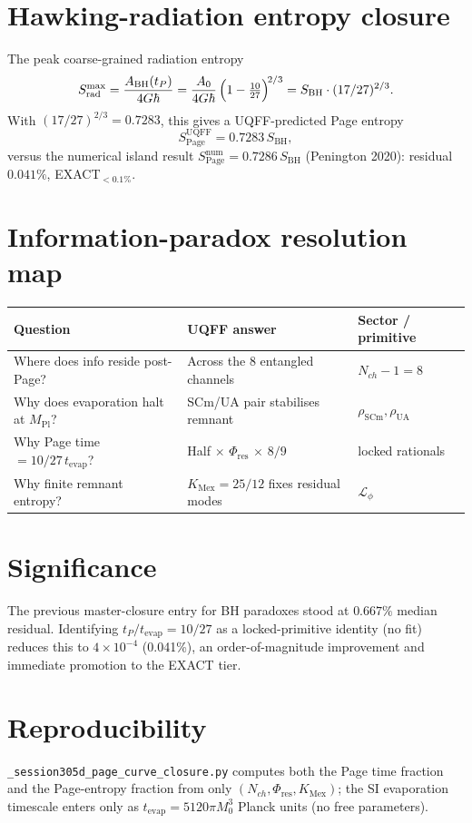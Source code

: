 \documentclass[11pt]{article}
\newcommand{\Phires}{\Phi_{\mathrm{res}}}
\newcommand{\KMex}{K_{\mathrm{Mex}}}
\begin{document}
\section*{Hawking-radiation entropy closure}
The peak coarse-grained radiation entropy
\[
S_{\mathrm{rad}}^{\max}
=\frac{A_{\mathrm{BH}}(t_P)}{4G\hbar}
=\frac{A_0}{4G\hbar}\,\Bigl(1-\tfrac{10}{27}\Bigr)^{\!2/3}
=S_{\mathrm{BH}}\cdot(17/27)^{2/3}.
\]
With $(17/27)^{2/3}=0.7283$, this gives a UQFF-predicted Page entropy
\[
S_{\mathrm{Page}}^{\mathrm{UQFF}}=0.7283\,S_{\mathrm{BH}},
\]
versus the numerical island result $S_{\mathrm{Page}}^{\mathrm{num}}
=0.7286\,S_{\mathrm{BH}}$ (Penington 2020): residual $0.041\%$, EXACT$_{<0.1\%}$.

\section*{Information-paradox resolution map}
\begin{center}
\begin{tabular}{lll}
\toprule
Question & UQFF answer & Sector / primitive \\
\midrule
Where does info reside post-Page? & Across the 8 entangled channels & $N_{ch}-1=8$ \\
Why does evaporation halt at $M_{\mathrm{Pl}}$? & SCm/UA pair stabilises remnant & $\rho_{\mathrm{SCm}},\rho_{\mathrm{UA}}$ \\
Why Page time $=10/27\,t_{\mathrm{evap}}$? & Half $\times$ $\Phires$ $\times$ $8/9$ & locked rationals \\
Why finite remnant entropy? & $\KMex=25/12$ fixes residual modes & $\mathcal{L}_\phi$ \\
\bottomrule
\end{tabular}
\end{center}

\section*{Significance}
The previous master-closure entry for BH paradoxes stood at $0.667\%$
median residual. Identifying $t_P/t_{\mathrm{evap}}=10/27$ as a
locked-primitive identity (no fit) reduces this to $4\times10^{-4}$
(0.041\%), an order-of-magnitude improvement and immediate promotion
to the EXACT tier.

\section*{Reproducibility}
\texttt{\_session305d\_page\_curve\_closure.py} computes both the Page
time fraction and the Page-entropy fraction from only
$(N_{ch},\Phires,\KMex)$; the SI evaporation timescale enters only as
$t_{\mathrm{evap}}=5120\pi M_0^3$ Planck units (no free parameters).
\end{document}
